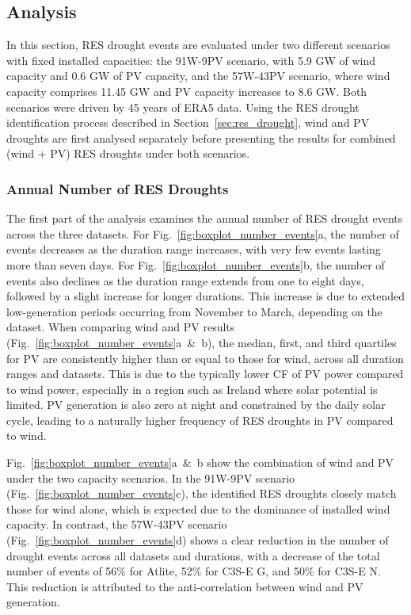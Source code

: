 \documentclass[a4paper, 11p1t]{article}
\begin{document}
\newpage
\subsection{Analysis}
\label{sec:Analysis}

In this section, RES drought events are evaluated under two different scenarios with fixed installed capacities: the 91W-9PV scenario, with 5.9 GW of wind capacity and 0.6 GW of PV capacity, and the 57W-43PV scenario, where wind capacity comprises 11.45 GW and PV capacity increases to 8.6 GW. Both scenarios were driven by 45 years of ERA5 data. Using the RES drought identification process described in Section~\ref{sec:res_drought}, wind and PV droughts are first analysed separately before presenting the results for combined (wind + PV) RES droughts under both scenarios.

\subsubsection{Annual Number of RES Droughts}

The first part of the analysis examines the annual number of RES drought events across the three datasets. For Fig.~\ref{fig:boxplot_number_events}a, the number of events decreases as the duration range increases, with very few events lasting more than seven days. For Fig.~\ref{fig:boxplot_number_events}b, the number of events also declines as the duration range extends from one to eight days, followed by a slight increase for longer durations. This increase is due to extended low-generation periods occurring from November to March, depending on the dataset. When comparing wind and PV results (Fig.~\ref{fig:boxplot_number_events}a~\&~b), the median, first, and third quartiles for PV are consistently higher than or equal to those for wind, across all duration ranges and datasets. This is due to the typically lower CF of PV power compared to wind power, especially in a region such as Ireland where solar potential is limited. PV generation is also zero at night and constrained by the daily solar cycle, leading to a naturally higher frequency of RES droughts in PV compared to wind.

Fig.~\ref{fig:boxplot_number_events}a~\&~b show the combination of wind and PV under the two capacity scenarios. In the 91W-9PV scenario (Fig.~\ref{fig:boxplot_number_events}c), the identified RES droughts closely match those for wind alone, which is expected due to the dominance of installed wind capacity. In contrast, the 57W-43PV scenario (Fig.~\ref{fig:boxplot_number_events}d) shows a clear reduction in the number of drought events across all datasets and durations, with a decrease of the total number of events of 56\% for Atlite, 52\% for C3S-E G, and 50\% for C3S-E N. This reduction is attributed to the anti-correlation between wind and PV generation.
\end{document}
